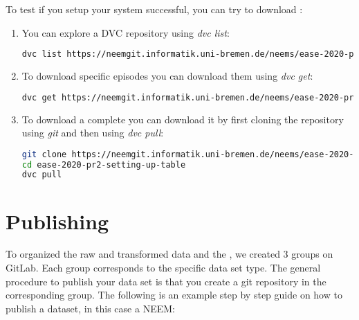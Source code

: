 To test if you setup your system successful, you can try to download \neems: 

\begin{enumerate}
	\item You can explore a DVC repository using \emph{dvc list}:
\begin{lstlisting}[language=bash, caption=Exploring a DVC repository using \emph{dvc list}]
dvc list https://neemgit.informatik.uni-bremen.de/neems/ease-2020-pr2-setting-up-table
\end{lstlisting}
	\item To download specific episodes you can download them using \emph{dvc get}:
\begin{lstlisting}[language=bash, caption=Downloading a episode using \emph{dvc get}]
dvc get https://neemgit.informatik.uni-bremen.de/neems/ease-2020-pr2-setting-up-table episodes/1599727087.4392.zip
\end{lstlisting}
	\item To download a complete \neem you can download it by first cloning the repository using \emph{git} and then using \emph{dvc pull}:
\begin{lstlisting}[language=bash, caption=Downloading a \neem using \emph{dvc pull}]
git clone https://neemgit.informatik.uni-bremen.de/neems/ease-2020-pr2-setting-up-table
cd ease-2020-pr2-setting-up-table
dvc pull
\end{lstlisting}
\end{enumerate}

\section{Publishing}
To organized the raw and transformed data and the \neems, we created 3 groups on GitLab.
Each group corresponds to the specific data set type.
The general procedure to publish your data set is that you create a git repository in the corresponding group. The following is an example step by step guide on how to publish a dataset, in this case a NEEM:

